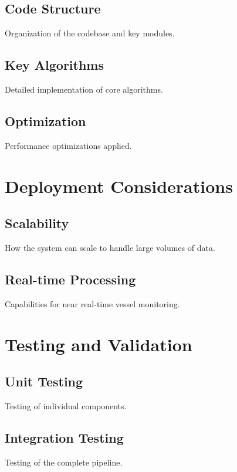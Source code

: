 \subsection{Code Structure}
Organization of the codebase and key modules.

\subsection{Key Algorithms}
Detailed implementation of core algorithms.

\subsection{Optimization}
Performance optimizations applied.

\section{Deployment Considerations}
\subsection{Scalability}
How the system can scale to handle large volumes of data.

\subsection{Real-time Processing}
Capabilities for near real-time vessel monitoring.

\section{Testing and Validation}
\subsection{Unit Testing}
Testing of individual components.

\subsection{Integration Testing}
Testing of the complete pipeline.
